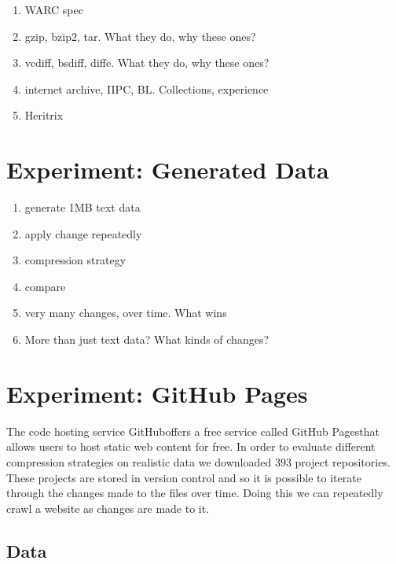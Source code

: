 \documentclass[11pt]{article}
\def \domainscrawled {393}
\begin{document}
  \begin{enumerate}
  \item WARC spec
  \item gzip, bzip2, tar. What they do, why these ones?
  \item vcdiff, bsdiff, diffe. What they do, why these ones?
  \item internet archive, IIPC, BL. Collections, experience
  \item Heritrix
  \end{enumerate}

\section{Experiment: Generated Data}

  \begin{enumerate}
  \item generate 1MB text data
  \item apply change repeatedly
  \item compression strategy
  \item compare
  \item very many changes, over time. What wins
  \item More than just text data? What kinds of changes?
  \end{enumerate}

\section{Experiment: GitHub Pages}\label{section:exp:github}

  The code hosting service GitHub\footnotemark offers a free service called GitHub Pages\footnotemark that allows users to host static web content for free. In order to evaluate different compression strategies on realistic data we downloaded $\domainscrawled$ project repositories. These projects are stored in version control and so it is possible to iterate through the changes made to the files over time. Doing this we can repeatedly crawl a website as changes are made to it.

  \subsection{Data}
\end{document}
